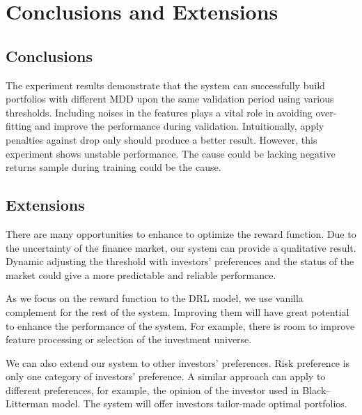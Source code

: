 \chapter{Conclusions and Extensions}
\label{c:conclusion}
\section{Conclusions}
The experiment results demonstrate that the system can successfully build portfolios with different MDD upon the same validation period using various thresholds. Including noises in the features plays a vital role in avoiding over-fitting and improve the performance during validation. Intuitionally, apply penalties against drop only should produce a better result. However, this experiment shows unstable performance. The cause could be lacking negative returns sample during training could be the cause.


\section{Extensions}

There are many opportunities to enhance to optimize the reward function. Due to the uncertainty of the finance market, our system can provide a qualitative result. Dynamic adjusting the threshold with investors' preferences and the status of the market could give a more predictable and reliable performance.

As we focus on the reward function to the DRL model, we use vanilla complement for the rest of the system. Improving them will have great potential to enhance the performance of the system. For example, there is room to improve feature processing or selection of the investment universe.

\par
We can also extend our system to other investors' preferences. Risk preference is only one category of investors' preference. A similar approach can apply to different preferences, for example, the opinion of the investor used in Black–Litterman model\cite{black1992global}. The system will offer investors tailor-made optimal portfolios.